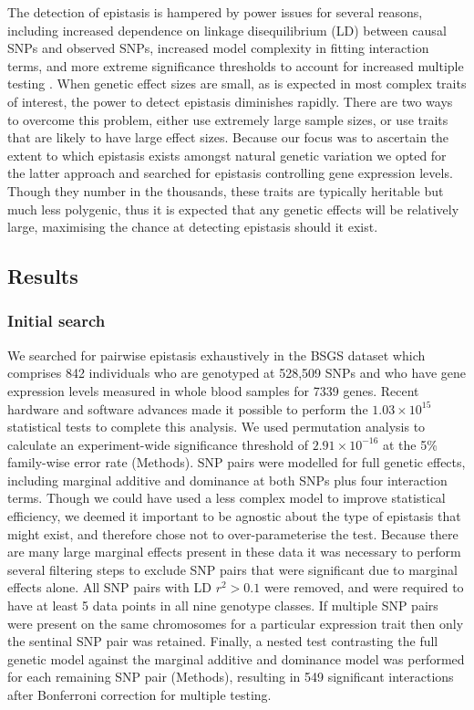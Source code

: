 \documentclass{article}
\begin{document}
The detection of epistasis is hampered by power issues for several reasons, including increased dependence on linkage disequilibrium (LD) between causal SNPs and observed SNPs, increased model complexity in fitting interaction terms, and more extreme significance thresholds to account for increased multiple testing \cite{Hemani2013}. When genetic effect sizes are small, as is expected in most complex traits of interest, the power to detect epistasis diminishes rapidly. There are two ways to overcome this problem, either use extremely large sample sizes, or use traits that are likely to have large effect sizes. Because our focus was to ascertain the extent to which epistasis exists amongst natural genetic variation we opted for the latter approach and searched for epistasis controlling gene expression levels. Though they number in the thousands, these traits are typically heritable but much less polygenic, thus it is expected that any genetic effects will be relatively large, maximising the chance at detecting epistasis should it exist.


\subsection{Results}

\subsubsection{Initial search}
We searched for pairwise epistasis exhaustively in the BSGS dataset which comprises 842 individuals who are genotyped at 528,509 SNPs and who have gene expression levels measured in whole blood samples for 7339 genes. Recent hardware and software advances made it possible to perform the $1.03 \times 10^{15}$ statistical tests to complete this analysis. We used permutation analysis to calculate an experiment-wide significance threshold of $2.91 \times 10^{-16}$ at the 5\% family-wise error rate (Methods). SNP pairs were modelled for full genetic effects, including marginal additive and dominance at both SNPs plus four interaction terms. Though we could have used a less complex model to improve statistical efficiency, we deemed it important to be agnostic about the type of epistasis that might exist, and therefore chose not to over-parameterise the test. Because there are many large marginal effects present in these data it was necessary to perform several filtering steps to exclude SNP pairs that were significant due to marginal effects alone. All SNP pairs with LD $r^2 > 0.1$ were removed, and were required to have at least 5 data points in all nine genotype classes. If multiple SNP pairs were present on the same chromosomes for a particular expression trait then only the sentinal SNP pair was retained. Finally, a nested test contrasting the full genetic model against the marginal additive and dominance model was performed for each remaining SNP pair (Methods), resulting in 549 significant interactions after Bonferroni correction for multiple testing.
\end{document}
